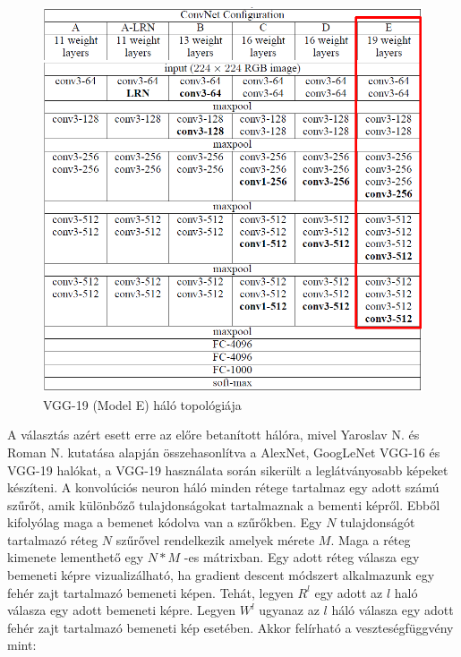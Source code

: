 \documentclass[12pt, a4paper, oneside]{book}
\theoremstyle{tetel}
\begin{document}
\begin{figure}[!htbp]
	\begin{center}
		\includegraphics[scale=0.3]{VGG19.png}
		\caption{VGG-19 (Model E) háló topológiája\cite{29}}
		\label{vgg_19}
	\end{center}
\end{figure}

A választás azért esett erre az előre betanított hálóra, mivel Yaroslav N. és Roman N. kutatása alapján\cite{16} összehasonlítva a AlexNet, GoogLeNet VGG-16 és VGG-19 halókat, a VGG-19 használata során sikerült a leglátványosabb képeket készíteni.
\newline
\indent
A konvolúciós neuron háló minden rétege tartalmaz egy adott számú szűrőt, amik különbőző tulajdonságokat tartalmaznak a bementi képről. Ebből kifolyólag maga a bemenet kódolva van a szűrőkben. Egy \(N\) tulajdonságót tartalmazó réteg \(N\) szűrővel rendelkezik amelyek mérete \(M\). Maga a réteg kimenete lementhető egy \(N * M\) -es mátrixban. Egy adott réteg válasza egy bemeneti képre vizualizálható, ha gradient descent módszert alkalmazunk egy fehér zajt tartalmazó bemeneti képen. Tehát, legyen \(R^l\) egy adott az \(l\) haló válasza egy adott bemeneti képre. Legyen \(W^l\) ugyanaz az \(l\) háló válasza egy adott fehér zajt tartalmazó bemeneti kép esetében. Akkor felírható a veszteségfüggvény mint:
\end{document}
